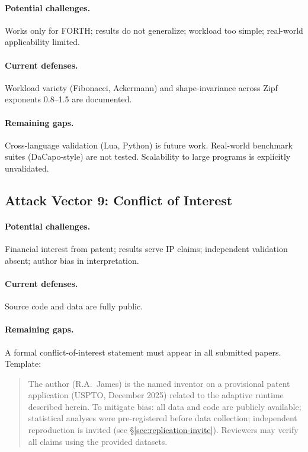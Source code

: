 \paragraph{Potential challenges.}
Works only for FORTH; results do not generalize; workload too simple;
real-world applicability limited.

\paragraph{Current defenses.}
Workload variety (Fibonacci, Ackermann) and shape-invariance across Zipf
exponents 0.8--1.5 are documented.

\paragraph{Remaining gaps.}
Cross-language validation (Lua, Python) is future work. Real-world benchmark
suites (DaCapo-style) are not tested. Scalability to large programs is
explicitly unvalidated.

\subsection{Attack Vector 9: Conflict of Interest}

\paragraph{Potential challenges.}
Financial interest from patent; results serve IP claims; independent
validation absent; author bias in interpretation.

\paragraph{Current defenses.}
Source code and data are fully public.

\paragraph{Remaining gaps.}
A formal conflict-of-interest statement must appear in all submitted papers.
Template:

\begin{quote}
The author (R.A.\ James) is the named inventor on a provisional patent
application (USPTO, December 2025) related to the adaptive runtime described
herein. To mitigate bias: all data and code are publicly available; statistical
analyses were pre-registered before data collection; independent reproduction
is invited (see \S\ref{sec:replication-invite}). Reviewers may verify all
claims using the provided datasets.
\end{quote}

